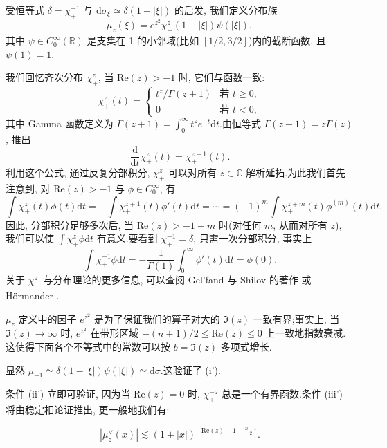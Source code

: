 受恒等式 $\delta = \chi_+^{-1}$ 与 $\mathrm{d}\sigma_\xi \simeq \delta(1 - |\xi|)$ 的启发, 我们定义分布族
\begin{equation}
\mu_z(\xi) = e^{z^2} \chi_+^z (1 - |\xi|) \psi(|\xi|), \label{eq:c6-289}
\end{equation}
其中 $\psi \in C_0^\infty(\mathbb{R})$ 是支集在 1 的小邻域(比如 $[1/2, 3/2]$)内的截断函数, 且 $\psi(1) = 1$.

我们回忆齐次分布 $\chi_+^z$, 当 $\mathrm{Re}(z) > -1$ 时, 它们与函数一致:
\[
\chi_+^z(t) = \left\{ \begin{array}{ll} t^z / \Gamma(z+1) & \text{若 } t \geq 0, \\ 0 & \text{若 } t < 0, \end{array} \right.
\]
其中 Gamma 函数定义为 $\Gamma(z+1) = \int_0^\infty t^z e^{-t} \mathrm{d}t$.由恒等式 $\Gamma(z+1) = z\Gamma(z)$, 推出
\begin{equation}
\frac{\mathrm{d}}{\mathrm{d}t} \chi_+^z(t) = \chi_+^{z-1}(t).\label{eq:c6-290}
\end{equation}
利用这个公式, 通过反复分部积分, $\chi_+^z$ 可以对所有 $z \in \mathbb{C}$ 解析延拓.为此我们首先注意到, 对 $\mathrm{Re}(z) > -1$ 与 $\phi \in C_0^\infty$, 有
\[
\int \chi_+^z(t) \phi(t) \mathrm{d}t = -\int \chi_+^{z+1}(t) \phi'(t) \mathrm{d}t = \cdots = (-1)^m \int \chi_+^{z+m}(t) \phi^{(m)}(t) \mathrm{d}t.
\]
因此, 分部积分足够多次后, 当 $\mathrm{Re}(z) > -1 - m$ 时(对任何 $m$, 从而对所有 $z$), 我们可以使 $\int \chi_+^z \phi \mathrm{d}t$ 有意义.要看到 $\chi_+^{-1} = \delta$, 只需一次分部积分, 事实上
\[
\int \chi_+^{-1} \phi \mathrm{d}t = -\frac{1}{\Gamma(1)} \int_0^\infty \phi'(t) \mathrm{d}t = \phi(0).
\]
关于 $\chi_+^z$ 与分布理论的更多信息, 可以查阅 Gel'fand 与 Shilov 的著作 \cite{ge-s} 或 Hörmander \cite{ho}.

$\mu_z$ 定义中的因子 $e^{z^2}$ 是为了保证我们的算子对大的 $\Im(z)$ 一致有界;事实上, 当 $\Im(z) \to \infty$ 时, $e^{z^2}$ 在带形区域 $-(n+1)/2 \leq \mathrm{Re}(z) \leq 0$ 上一致地指数衰减.这使得下面各个不等式中的常数可以按 $b = \Im(z)$ 多项式增长.

显然 $\mu_{-1} \simeq \delta(1 - |\xi|) \psi(|\xi|) \simeq \mathrm{d}\sigma$.这验证了 (i').

条件 (ii') 立即可验证, 因为当 $\mathrm{Re}(z) = 0$ 时, $\chi_+^{-z}$ 总是一个有界函数.条件 (iii') 将由稳定相论证推出, 更一般地我们有:

\begin{proposition}\label{prop:c6-8.15}
\begin{equation}
|\mu_z^\vee(x)| \lesssim (1 + |x|)^{-\mathrm{Re}(z) - 1 - \frac{n-1}{2}}.\label{eq:c6-291}
\end{equation}
\end{proposition}

